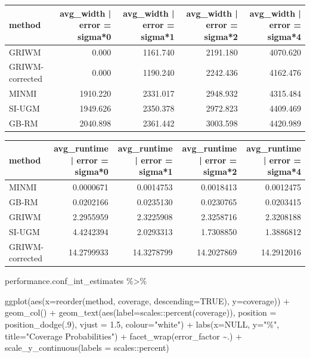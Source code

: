 \documentclass[
]{article}
\newenvironment{Shaded}{\begin{snugshade}}{\end{snugshade}}
\newcommand{\AttributeTok}[1]{\textcolor[rgb]{0.77,0.63,0.00}{#1}}
\newcommand{\ConstantTok}[1]{\textcolor[rgb]{0.00,0.00,0.00}{#1}}
\newcommand{\DecValTok}[1]{\textcolor[rgb]{0.00,0.00,0.81}{#1}}
\newcommand{\FloatTok}[1]{\textcolor[rgb]{0.00,0.00,0.81}{#1}}
\newcommand{\FunctionTok}[1]{\textcolor[rgb]{0.00,0.00,0.00}{#1}}
\newcommand{\NormalTok}[1]{#1}
\newcommand{\SpecialCharTok}[1]{\textcolor[rgb]{0.00,0.00,0.00}{#1}}
\newcommand{\StringTok}[1]{\textcolor[rgb]{0.31,0.60,0.02}{#1}}
\begin{document}
\begin{tabular}{l|r|r|r|r}
\hline
method & avg\_width | error = sigma*0 & avg\_width | error = sigma*1 & avg\_width | error = sigma*2 & avg\_width | error = sigma*4\\
\hline
GRIWM & 0.000 & 1161.740 & 2191.180 & 4070.620\\
\hline
GRIWM-corrected & 0.000 & 1190.240 & 2242.436 & 4162.476\\
\hline
MINMI & 1910.220 & 2331.017 & 2948.932 & 4315.484\\
\hline
SI-UGM & 1949.626 & 2350.378 & 2972.823 & 4409.469\\
\hline
GB-RM & 2040.898 & 2361.442 & 3003.598 & 4420.989\\
\hline
\end{tabular}

\begin{tabular}{l|r|r|r|r}
\hline
method & avg\_runtime | error = sigma*0 & avg\_runtime | error = sigma*1 & avg\_runtime | error = sigma*2 & avg\_runtime | error = sigma*4\\
\hline
MINMI & 0.0000671 & 0.0014753 & 0.0018413 & 0.0012475\\
\hline
GB-RM & 0.0202166 & 0.0235130 & 0.0230765 & 0.0203415\\
\hline
GRIWM & 2.2955959 & 2.3225908 & 2.3258716 & 2.3208188\\
\hline
SI-UGM & 4.4242394 & 2.0293313 & 1.7308850 & 1.3886812\\
\hline
GRIWM-corrected & 14.2799933 & 14.3278799 & 14.2027869 & 14.2912016\\
\hline
\end{tabular}

\begin{Shaded}
\begin{Highlighting}[]
\NormalTok{performance.conf\_int\_estimates }\SpecialCharTok{\%\textgreater{}\%}
  
  \FunctionTok{ggplot}\NormalTok{(}\FunctionTok{aes}\NormalTok{(}\AttributeTok{x=}\FunctionTok{reorder}\NormalTok{(method, coverage, }\AttributeTok{descending=}\ConstantTok{TRUE}\NormalTok{), }\AttributeTok{y=}\NormalTok{coverage)) }\SpecialCharTok{+}
  \FunctionTok{geom\_col}\NormalTok{() }\SpecialCharTok{+}
  \FunctionTok{geom\_text}\NormalTok{(}\FunctionTok{aes}\NormalTok{(}\AttributeTok{label=}\NormalTok{scales}\SpecialCharTok{::}\FunctionTok{percent}\NormalTok{(coverage)), }\AttributeTok{position =} \FunctionTok{position\_dodge}\NormalTok{(.}\DecValTok{9}\NormalTok{), }\AttributeTok{vjust =} \FloatTok{1.5}\NormalTok{, }\AttributeTok{colour=}\StringTok{"white"}\NormalTok{) }\SpecialCharTok{+}
  \FunctionTok{labs}\NormalTok{(}\AttributeTok{x=}\ConstantTok{NULL}\NormalTok{, }\AttributeTok{y=}\StringTok{"\%"}\NormalTok{, }\AttributeTok{title=}\StringTok{"Coverage Probabilities"}\NormalTok{) }\SpecialCharTok{+}
  \FunctionTok{facet\_wrap}\NormalTok{(error\_factor }\SpecialCharTok{\textasciitilde{}}\NormalTok{.) }\SpecialCharTok{+}
  \FunctionTok{scale\_y\_continuous}\NormalTok{(}\AttributeTok{labels =}\NormalTok{ scales}\SpecialCharTok{::}\NormalTok{percent)}
\end{Highlighting}
\end{Shaded}
\end{document}
